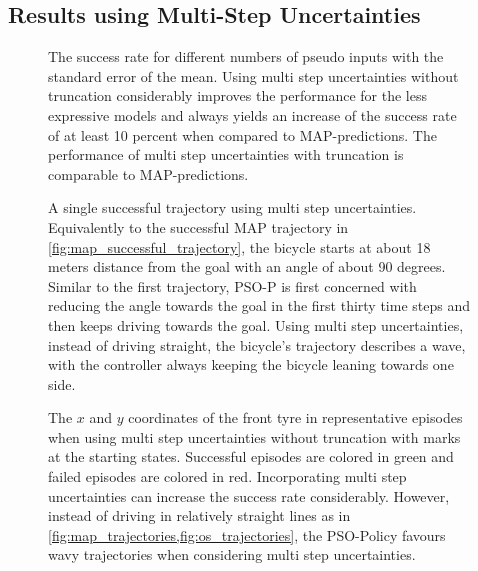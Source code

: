 \subsection{Results using Multi-Step Uncertainties}
\begin{figure}[tp]
    \centering
    \caption[Results using multi step uncertainties]{
        The success rate for different numbers of pseudo inputs with the standard error of the mean.
        Using multi step uncertainties without truncation considerably improves the performance for the less expressive models and always yields an increase of the success rate of at least 10 percent when compared to MAP-predictions.
        The performance of multi step uncertainties with truncation is comparable to MAP-predictions.
    }
    \label{fig:ms_results}
\end{figure}
\begin{figure}[p]
    \centering
    \caption[Successful trajectory using multi step uncertainties]{
        A single successful trajectory using multi step uncertainties.
        Equivalently to the successful MAP trajectory in \cref{fig:map_successful_trajectory}, the bicycle starts at about 18 meters distance from the goal with an angle of about 90 degrees.
        Similar to the first trajectory, PSO-P is first concerned with reducing the angle towards the goal in the first thirty time steps and then keeps driving towards the goal.
        Using multi step uncertainties, instead of driving straight, the bicycle's trajectory describes a wave, with the controller always keeping the bicycle leaning towards one side.
    }
    \label{fig:ms_successful_trajectory}
\end{figure}
\begin{figure}[p]
    \centering
    \caption[Episodes using multi step uncertainties without truncation]{
        The $x$ and $y$ coordinates of the front tyre in representative episodes when using multi step uncertainties without truncation with marks at the starting states.
        Successful episodes are colored in green and failed episodes are colored in red.
        Incorporating multi step uncertainties can increase the success rate considerably.
        However, instead of driving in relatively straight lines as in \cref{fig:map_trajectories,fig:os_trajectories}, the PSO-Policy favours wavy trajectories when considering multi step uncertainties.
    }
    \label{fig:ms_trajectories}
\end{figure}
